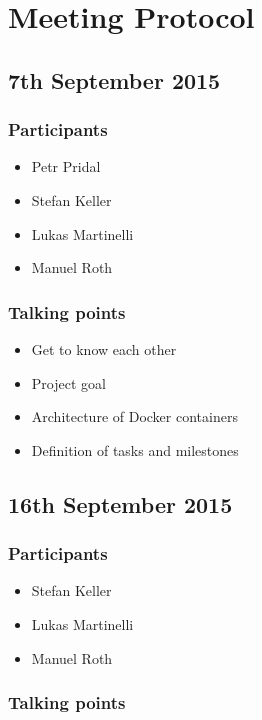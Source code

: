 \chapter*{Meeting Protocol}

\section*{7th September 2015}

\subsection*{Participants}
\begin{itemize}
  \item Petr Pridal
  \item Stefan Keller
  \item Lukas Martinelli
  \item Manuel Roth
\end{itemize}


\subsection*{Talking points}

\begin{itemize}
  \item Get to know each other
  \item Project goal
  \item Architecture of Docker containers
  \item Definition of tasks and milestones
\end{itemize}

\section*{16th September 2015}

\subsection*{Participants}

\begin{itemize}
  \item Stefan Keller
  \item Lukas Martinelli
  \item Manuel Roth
\end{itemize}


\subsection*{Talking points}

